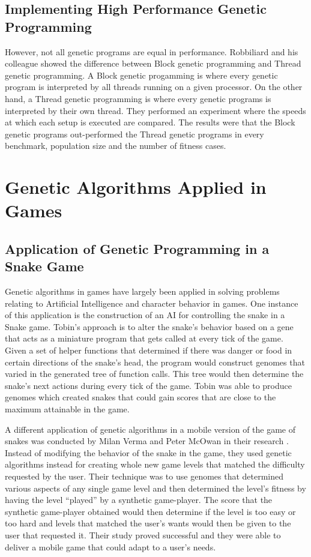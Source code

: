 \subsection{Implementing High Performance Genetic Programming}
However, not all genetic programs are equal in performance. Robbiliard and his colleague showed the difference between
Block genetic programming and Thread genetic programming\cite{Robbilliard09}. A Block
genetic progamming is where every genetic program is interpreted by all threads running
on a given processor. On the other hand, a Thread genetic programming is where every genetic
programs is interpreted by their own thread. They performed an experiment where
the speeds at which each setup is executed are compared. The results were that the Block genetic
programs out-performed the Thread genetic programs in every benchmark, population size and
the number of fitness cases.

\section{Genetic Algorithms Applied in Games}
\subsection{Application of Genetic Programming in a Snake Game}
Genetic algorithms in games have largely been applied in solving problems relating to
Artificial Intelligence and character behavior in games. One instance of this application
is the construction of an AI for controlling the snake in a Snake game\cite{Ehlis00}.
Tobin's approach is to alter the snake's behavior based on a gene that acts as a miniature
program that gets called at every tick of the game. Given a set of helper functions that
determined if there was danger or food in certain directions of the snake's head, the
program would construct genomes that varied in the generated tree of function calls. This
tree would then determine the snake's next actions during every tick of the game. Tobin
was able to produce genomes which created snakes that could gain scores that are close to
the maximum attainable in the game.  


A different application of genetic algorithms in a mobile version of the game of snakes
was conducted by Milan Verma and Peter McOwan in their research \cite{Verma05}. Instead
of modifying the behavior of the snake in the game, they used genetic algorithms instead
for creating whole new game levels that matched the difficulty requested by the user.
Their technique was to use genomes that determined various aspects of any single game
level and then determined the level's fitness by having the level “played” by a synthetic
game-player. The score that the synthetic game-player obtained would then determine if
the level is too easy or too hard and levels that matched the user's wants would then be
given to the user that requested it. Their study proved successful and they were able to
deliver a mobile game that could adapt to a user's needs.


